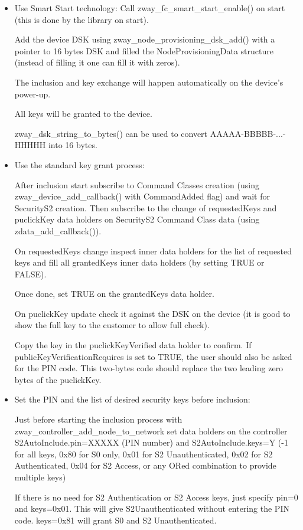 \begin{itemize}
\item Use Smart Start technology:
   Call zway\_fc\_smart\_start\_enable() on start (this is done by the library on start).

   Add the device DSK using zway\_node\_provisioning\_dsk\_add() with a pointer to 16 bytes DSK and filled the NodeProvisioningData structure (instead of filling it one can fill it with zeros).

   The inclusion and key exchange will happen automatically on the device's power-up.

   All keys will be granted to the device.

   zway\_dsk\_string\_to\_bytes() can be used to convert AAAAA-BBBBB-...-HHHHH into 16 bytes.
\item Use the standard key grant process:

   After inclusion start subscribe to Command Classes creation (using zway\_device\_add\_callback() with CommandAdded flag) and wait for SecurityS2 creation. Then subscribe to the change of requestedKeys and puclickKey data holders on SecurityS2 Command Class data (using zdata\_add\_callback()).

   On requestedKeys change inspect inner data holders for the list of requested keys and fill all grantedKeys inner data holders (by setting TRUE or FALSE).

   Once done, set TRUE on the grantedKeys data holder.

   On puclickKey update check it against the DSK on the device (it is good to show the full key to the customer to allow full check).

   Copy the key in the puclickKeyVerified data holder to confirm. If publicKeyVerificationRequires is set to TRUE, the user should also be asked for the PIN code. This two-bytes code should replace the two leading zero bytes of the puclickKey.
\item Set the PIN and the list of desired security keys before inclusion:

    Just before starting the inclusion process with zway\_controller\_add\_node\_to\_network set data holders on the controller S2AutoInclude.pin=XXXXX (PIN number) and S2AutoInclude.keys=Y (-1 for all keys, 0x80 for S0 only, 0x01 for S2 Unauthenticated, 0x02 for S2 Authenticated, 0x04 for S2 Access, or any ORed combination to provide multiple keys)

    If there is no need for S2 Authentication or S2 Access keys, just specify pin=0 and keys=0x01. This will give S2Unauthenticated without entering the PIN code. keys=0x81 will grant S0 and S2 Unauthenticated.
\end{itemize}

